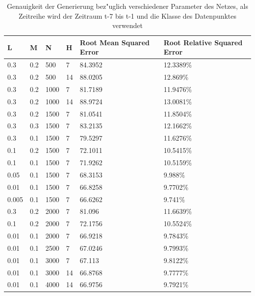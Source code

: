 \begin{table}[h]
\begin{tabular}{l|l|l|l|p{3cm}|p{3cm}}
L & M & N & H & Root Mean Squared Error & Root Relative Squared Error \\
\hline
0.3 & 0.2 & 500 & 7 & 84.3952 & 12.3389\% \\
0.3 & 0.2 & 500 & 14 & 88.0205 & 12.869\% \\
0.3 & 0.2 & 1000 & 7 & 81.7189 & 11.9476\% \\
0.3 & 0.2 & 1000 & 14 & 88.9724 & 13.0081\% \\
0.3 & 0.2 & 1500 & 7 & 81.0541 & 11.8504\% \\
0.3 & 0.3 & 1500 & 7 & 83.2135 & 12.1662\% \\
0.3 & 0.1 & 1500 & 7 & 79.5297 & 11.6276\% \\
0.1 & 0.2 & 1500 & 7 & 72.1011 & 10.5415\% \\
0.1 & 0.1 & 1500 & 7 & 71.9262 & 10.5159\% \\
0.05 & 0.1 & 1500 & 7 & 68.3153 & 9.988\% \\
0.01 & 0.1 & 1500 & 7 & 66.8258 & 9.7702\% \\
0.005 & 0.1 & 1500 & 7 & 66.6262 & 9.741\% \\
0.3 & 0.2 & 2000 & 7 & 81.096  & 11.6639\% \\
0.1 & 0.2 & 2000 & 7 & 72.1756 & 10.5524\% \\
0.01 & 0.1 & 2000 & 7 & 66.9218 & 9.7843\% \\
0.01 & 0.1 & 2500 & 7 & 67.0246 & 9.7993\% \\
0.01 & 0.1 & 3000 & 7 & 67.113 & 9.8122\% \\
0.01 & 0.1 & 3000 & 14 & 66.8768 & 9.7777\% \\
0.01 & 0.1 & 4000 & 14 & 66.9756 & 9.7921\% \\


\end{tabular}
\caption[Parameterver"anderungen f"ur Generierung]{Genauigkeit der Generierung bez"uglich verschiedener Parameter des Netzes, als Zeitreihe wird der Zeitraum t-7 bis t-1 und die Klasse des Datenpunktes verwendet}
\label{GenParam}
\end{table}

